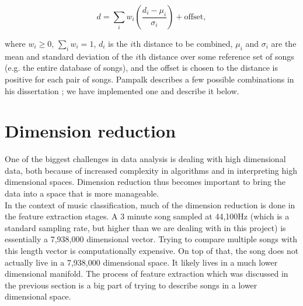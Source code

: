 \documentclass[12pt]{article}
\begin{document}
\[ d = \sum_{i} w_i \left(\dfrac{d_i - \mu_i}{\sigma_i}\right) + \text{offset}, \]

\noindent where $w_i\ge 0$, $\sum_i w_i=1$, $d_i$ is the $i$th distance to be combined, $\mu_i$ and $\sigma_i$ are the mean and standard deviation of the $i$th distance over some reference set of songs (e.g. the entire database of songs), and the offset is chosen to the distance is positive for each pair of songs.  Pampalk describes a few possible combinations in his dissertation \cite{pampalk:dissertation}; we have implemented one and describe it below.\\


\section{Dimension reduction}
%

One of the biggest challenges in data analysis is dealing with high dimensional data, both because of increased complexity in algorithms and in interpreting high dimensional spaces.  Dimension reduction thus becomes important to bring the data into a space that is more manageable.\\

In the context of music classification, much of the dimension reduction is done in the feature extraction stages.  A 3 minute song sampled at 44,100Hz (which is a standard sampling rate, but higher than we are dealing with in this project) is essentially a 7,938,000 dimensional vector.  Trying to compare multiple songs with this length vector is computationally expensive.  On top of that, the song does not actually live in a 7,938,000 dimensional space.  It likely lives in a much lower dimensional manifold.  The process of feature extraction which was discussed in the previous section is a big part of trying to describe songs in a lower dimensional space.\\
\end{document}
